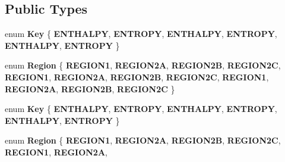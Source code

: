 \subsection*{Public Types}
\begin{DoxyCompactItemize}
\item 
\mbox{\label{class_steam_system_modeler_tool_aed38516c350ca4ecf17b545e07d41dcd}} 
enum {\bfseries Key} \{ \newline
{\bfseries E\+N\+T\+H\+A\+L\+PY}, 
{\bfseries E\+N\+T\+R\+O\+PY}, 
{\bfseries E\+N\+T\+H\+A\+L\+PY}, 
{\bfseries E\+N\+T\+R\+O\+PY}, 
\newline
{\bfseries E\+N\+T\+H\+A\+L\+PY}, 
{\bfseries E\+N\+T\+R\+O\+PY}
 \}
\item 
\mbox{\label{class_steam_system_modeler_tool_a162eeadc7eb56a9b50b7a8f630eb8f05}} 
enum {\bfseries Region} \{ \newline
{\bfseries R\+E\+G\+I\+O\+N1}, 
{\bfseries R\+E\+G\+I\+O\+N2A}, 
{\bfseries R\+E\+G\+I\+O\+N2B}, 
{\bfseries R\+E\+G\+I\+O\+N2C}, 
\newline
{\bfseries R\+E\+G\+I\+O\+N1}, 
{\bfseries R\+E\+G\+I\+O\+N2A}, 
{\bfseries R\+E\+G\+I\+O\+N2B}, 
{\bfseries R\+E\+G\+I\+O\+N2C}, 
\newline
{\bfseries R\+E\+G\+I\+O\+N1}, 
{\bfseries R\+E\+G\+I\+O\+N2A}, 
{\bfseries R\+E\+G\+I\+O\+N2B}, 
{\bfseries R\+E\+G\+I\+O\+N2C}
 \}
\item 
\mbox{\label{class_steam_system_modeler_tool_aed38516c350ca4ecf17b545e07d41dcd}} 
enum {\bfseries Key} \{ \newline
{\bfseries E\+N\+T\+H\+A\+L\+PY}, 
{\bfseries E\+N\+T\+R\+O\+PY}, 
{\bfseries E\+N\+T\+H\+A\+L\+PY}, 
{\bfseries E\+N\+T\+R\+O\+PY}, 
\newline
{\bfseries E\+N\+T\+H\+A\+L\+PY}, 
{\bfseries E\+N\+T\+R\+O\+PY}
 \}
\item 
\mbox{\label{class_steam_system_modeler_tool_a162eeadc7eb56a9b50b7a8f630eb8f05}} 
enum {\bfseries Region} \{ \newline
{\bfseries R\+E\+G\+I\+O\+N1}, 
{\bfseries R\+E\+G\+I\+O\+N2A}, 
{\bfseries R\+E\+G\+I\+O\+N2B}, 
{\bfseries R\+E\+G\+I\+O\+N2C}, 
\newline
{\bfseries R\+E\+G\+I\+O\+N1}, 
{\bfseries R\+E\+G\+I\+O\+N2A}, 

\end{DoxyCompactItemize}
